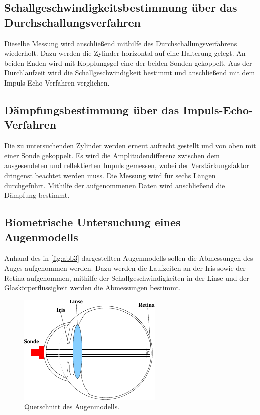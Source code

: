 \subsection{Schallgeschwindigkeitsbestimmung über das Durchschallungsverfahren}

Dieselbe Messung wird anschließend mithilfe des Durchschallungsverfahrens wiederholt.
Dazu werden die Zylinder horizontal auf eine Halterung gelegt. An beiden Enden wird mit Kopplungsgel eine der beiden Sonden gekoppelt. %
Aus der Durchlaufzeit wird die Schallgeschwindigkeit bestimmt und anschließend mit dem Impuls-Echo-Verfahren verglichen. \\


\subsection{Dämpfungsbestimmung über das Impuls-Echo-Verfahren}

Die zu untersuchenden Zylinder werden erneut aufrecht gestellt und von oben mit einer Sonde gekoppelt.
Es wird die Amplitudendifferenz zwischen dem ausgesendeten und reflektierten Impuls gemessen, wobei der Verstärkungsfaktor dringenst beachtet werden muss.%
Die Messung wird für sechs Längen durchgeführt. Mithilfe der aufgenommenen Daten wird anschließend die Dämpfung bestimmt. %


\subsection{Biometrische Untersuchung eines Augenmodells}

Anhand des in \autoref{fig:abb3} dargestellten Augenmodells sollen die Abmessungen des Auges aufgenommen werden.
Dazu werden die Laufzeiten an der Iris sowie der Retina aufgenommen, mithilfe der Schallgeschwindigkeiten in der Linse und der Glaskörperflüssigkeit werden die Abmessungen bestimmt.
\begin{figure}
    \centering
    \includegraphics{figures/abb3.pdf} 
    \caption{Querschnitt des Augenmodells\cite{ap06}.}
    \label{fig:abb3}
\end{figure}






